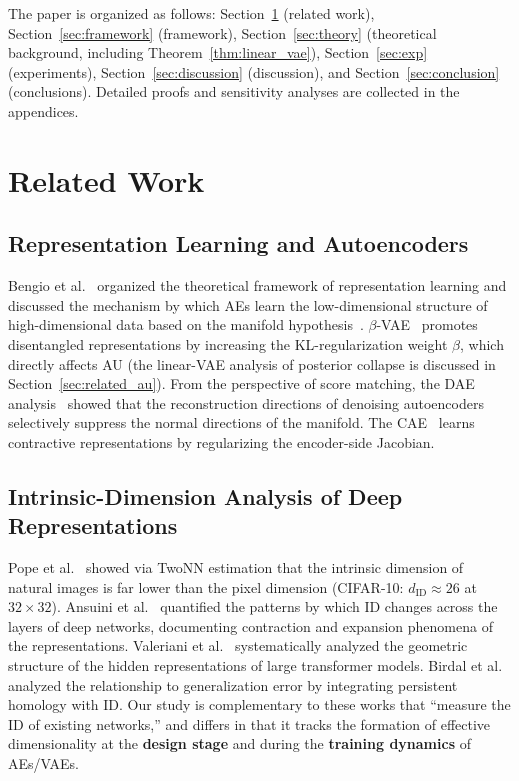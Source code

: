 \documentclass[make,article,submit,pdftex,moreauthors]{Definitions/mdpi}
\begin{document}
The paper is organized as follows:
Section~\ref{sec:related} (related work), Section~\ref{sec:framework} (framework),
Section~\ref{sec:theory} (theoretical background, including Theorem~\ref{thm:linear_vae}),
Section~\ref{sec:exp} (experiments), Section~\ref{sec:discussion} (discussion),
and Section~\ref{sec:conclusion} (conclusions).
Detailed proofs and sensitivity analyses are collected in the appendices.

\section{Related Work}\label{sec:related}

\subsection{Representation Learning and Autoencoders}\label{sec:related_ae}

Bengio et al.~\cite{bengio2013representation} organized the theoretical
framework of representation learning and discussed the mechanism by which AEs
learn the low-dimensional structure of high-dimensional data based on the
manifold hypothesis~\cite{fefferman2016manifold}.
$\beta$-VAE~\cite{higgins2017betavae} promotes disentangled representations by
increasing the KL-regularization weight $\beta$, which directly affects AU
(the linear-VAE analysis of posterior collapse is discussed in
Section~\ref{sec:related_au}).
From the perspective of score matching, the DAE analysis~\cite{alain2014dae}
showed that the reconstruction directions of denoising autoencoders selectively
suppress the normal directions of the manifold.
The CAE~\cite{rifai2011cae} learns contractive representations by regularizing
the encoder-side Jacobian.

\subsection{Intrinsic-Dimension Analysis of Deep Representations}\label{sec:related_id}

Pope et al.~\cite{pope2021intrinsic} showed via TwoNN estimation that the
intrinsic dimension of natural images is far lower than the pixel dimension
(CIFAR-10: $d_\mathrm{ID} \approx 26$ at $32 \times 32$).
Ansuini et al.~\cite{ansuini2019intrinsic} quantified the patterns by which ID
changes across the layers of deep networks, documenting contraction and
expansion phenomena of the representations.
Valeriani et al.~\cite{valeriani2023geometry} systematically analyzed the
geometric structure of the hidden representations of large transformer models.
Birdal et al.~\cite{birdal2021intrinsic} analyzed the relationship to
generalization error by integrating persistent homology with ID.
Our study is complementary to these works that ``measure the ID of existing
networks,'' and differs in that it tracks the formation of effective
dimensionality at the \textbf{design stage} and during the
\textbf{training dynamics} of AEs/VAEs.
\end{document}
